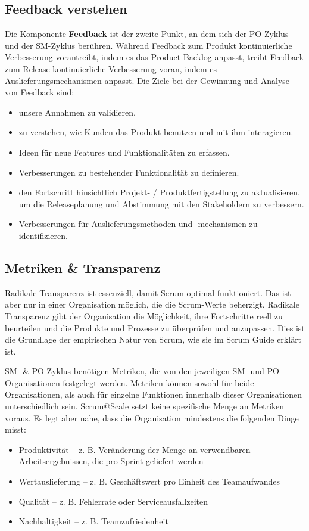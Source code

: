 \documentclass[12pt,a4paper,parskip=full]{scrartcl}
\begin{document}
\subsection{Feedback verstehen}
Die Komponente \textbf{Feedback} ist der zweite Punkt, an dem sich der PO-Zyklus
und der SM-Zyklus berühren. Während Feedback zum Produkt kontinuierliche
Verbesserung vorantreibt, indem es das Product Backlog anpasst, treibt Feedback
zum Release kontinuierliche Verbesserung voran, indem es Auslieferungsmechanismen
anpasst. Die Ziele bei der Gewinnung und Analyse von Feedback sind:
\begin{itemize}
\item unsere Annahmen zu validieren.
\item zu verstehen, wie Kunden das Produkt benutzen und mit ihm interagieren.
\item Ideen für neue Features und Funktionalitäten zu erfassen.
\item Verbesserungen zu bestehender Funktionalität zu definieren.
\item den Fortschritt hinsichtlich Projekt- / Produktfertigstellung zu aktualisieren, um die Releaseplanung und Abstimmung mit den Stakeholdern zu verbessern.
\item Verbesserungen für Auslieferungsmethoden und -mechanismen zu identifizieren.
\end{itemize}

\subsection{Metriken \& Transparenz}
Radikale Transparenz ist essenziell, damit Scrum optimal funktioniert. Das ist aber
nur in einer Organisation möglich, die die Scrum-Werte beherzigt. Radikale
Transparenz gibt der Organisation die Möglichkeit, ihre Fortschritte reell zu
beurteilen und die Produkte und Prozesse zu überprüfen und anzupassen. Dies ist
die Grundlage der empirischen Natur von Scrum, wie sie im Scrum Guide erklärt ist.

SM- \& PO-Zyklus benötigen Metriken, die von den jeweiligen SM- und
PO-Organisationen festgelegt werden. Metriken können sowohl für beide Organisationen, 
als auch für einzelne Funktionen innerhalb dieser Organisationen
unterschiedlich sein. Scrum@Scale setzt keine spezifische Menge an Metriken voraus.
Es legt aber nahe, dass die Organisation mindestens die folgenden Dinge misst:
\begin{itemize}
\item Produktivität – z. B. Veränderung der Menge an verwendbaren Arbeitsergebnissen,
die pro Sprint geliefert werden
\item Wertauslieferung – z. B. Geschäftswert pro Einheit des Teamaufwandes
\item Qualität – z. B. Fehlerrate oder Serviceausfallzeiten
\item Nachhaltigkeit – z. B. Teamzufriedenheit
\end{itemize}
\end{document}
